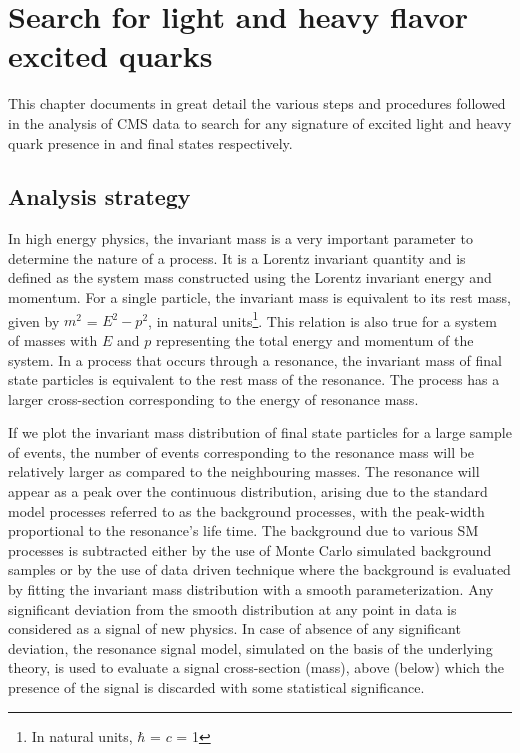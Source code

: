 \chapter{Search for light and heavy flavor excited quarks}
This chapter documents in great detail the various steps and procedures followed in the analysis of CMS data to search for any signature of excited light and
heavy quark presence in \gamjet and \gambjet final states respectively. 
\section{Analysis strategy}
In high energy physics, the invariant mass is a very important parameter to determine the nature of a process. It is a Lorentz invariant
quantity and is defined as the system mass constructed using the Lorentz invariant energy and momentum. For a single particle, the invariant mass
is equivalent to its rest mass, given by $m^{2}$ = $E^{2} - p^{2}$, in natural units\footnote{In natural units, $\hbar$ = $c$ = 1}. This relation is also true for a
system of masses with $E$ and $p$ representing the total energy and momentum of the system. In a process that occurs through a resonance,
the invariant mass of final state particles is equivalent to the rest mass of the resonance. The process has a larger cross-section corresponding to the energy of
resonance mass. 

If we plot the invariant mass distribution of final state particles for a large sample of events, the number of events
corresponding to the resonance mass will be relatively larger as compared to the neighbouring masses. %
The resonance will appear as a peak over the continuous distribution, arising due to
the standard model processes referred to as the background processes, with the peak-width proportional to the resonance's life time.
The background due to various SM processes is subtracted either by the use of Monte Carlo simulated background samples or by the use of data driven
technique where the background is evaluated by fitting the invariant mass distribution with a smooth parameterization. Any significant deviation from
the smooth distribution at any point in data is considered as a signal of new physics. In case of absence of any significant deviation, the resonance signal model,
simulated on the basis of the underlying theory, is used to evaluate a signal cross-section (mass), above (below) which the presence of the signal
is discarded with some statistical significance.

